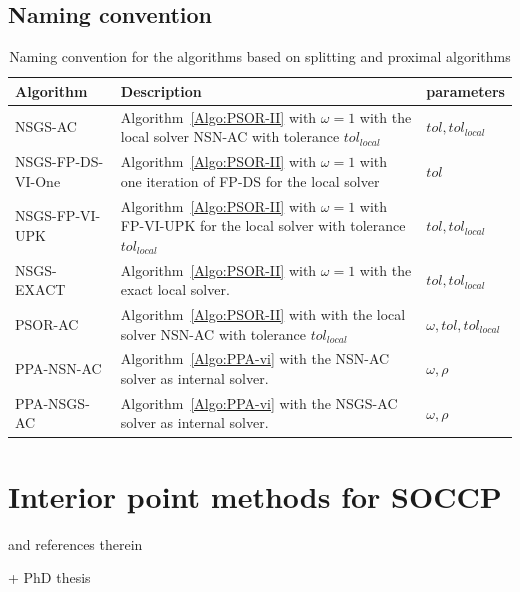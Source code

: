 \subsection{Naming convention}
\begin{table}
  \centering
  \begin{tabular}{|l|p{}|l|}
    \hline
    { Algorithm}
    & Description 
    & parameters\\
    \hline
    \sf NSGS-AC
    & Algorithm~\ref{Algo:PSOR-II} with $\omega=1$ with the local solver NSN-AC with tolerance $tol_{local}$
    & $tol, tol_{local}$\\
    \hline
    \sf NSGS-FP-DS-VI-One
    & Algorithm~\ref{Algo:PSOR-II} with $\omega=1$ with one iteration of FP-DS for the local solver
    & $tol$\\
    \hline
    \sf NSGS-FP-VI-UPK
    & Algorithm~\ref{Algo:PSOR-II} with $\omega=1$ with FP-VI-UPK for the local solver with tolerance $tol_{local}$
    & $tol, tol_{local}$\\
    \hline
    \sf NSGS-EXACT
    & Algorithm~\ref{Algo:PSOR-II} with $\omega=1$ with the exact local solver.
    & $tol, tol_{local}$\\
    \hline
    \hline
    \sf PSOR-AC 
    &  Algorithm~\ref{Algo:PSOR-II} with  with the local solver NSN-AC with tolerance $tol_{local}$
    & $\omega, tol,  tol_{local}$\\
    \hline
    \hline
    \sf PPA-NSN-AC 
    &  Algorithm~\ref{Algo:PPA-vi} with the NSN-AC solver as internal solver.
    & $\omega,\rho$\\
    \hline
    \sf PPA-NSGS-AC
    &  Algorithm~\ref{Algo:PPA-vi} with the NSGS-AC solver as internal solver.
    & $\omega,\rho$\\
    \hline
  \end{tabular}
  \caption{Naming convention for the algorithms based on splitting and proximal algorithms}
  \label{tab:PSOR-PPA-algos}
\end{table}

\section{Interior point methods for SOCCP}
\label{Sec:InteriorPoint}

\cite{Kleinert.ea_CMAME2014} and references therein

\cite{Christensen.Pang1998}


\cite{Heyn.ea_IJNME2013} + PhD thesis \cite{Heyn_PhD2013}

